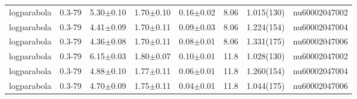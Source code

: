 \begin{table*}
\begin{tabular}{c|c|c|c|c|c|c|c}
logparabola   &  0.3-79 &    5.30$\pm$0.10    &    1.70$\pm$0.10   &   0.16$\pm$0.02  & 8.06 &    1.015(130)      & nu60002047002\\
logparabola   &  0.3-79 &    4.41$\pm$0.09    &    1.70$\pm$0.11   &   0.09$\pm$0.03  & 8.06 &    1.224(154)      & nu60002047004\\
logparabola   &  0.3-79 &    4.36$\pm$0.08    &    1.70$\pm$0.11   &   0.08$\pm$0.01  & 8.06 &    1.331(175)      & nu60002047006\\
\hline
logparabola   &  0.3-79 &    6.15$\pm$0.03    &    1.80$\pm$0.07   &   0.10$\pm$0.01  & 11.8 &    1.028(130)      & nu60002047002\\
logparabola   &  0.3-79 &    4.88$\pm$0.10    &    1.77$\pm$0.11   &   0.06$\pm$0.01  & 11.8 &    1.260(154)      & nu60002047004\\
logparabola   &  0.3-79 &    4.70$\pm$0.09    &    1.75$\pm$0.11   &   0.04$\pm$0.01  & 11.8 &    1.044(175)      & nu60002047006\\



\hline

 
\end{tabular}
\end{table*}


\noindent
